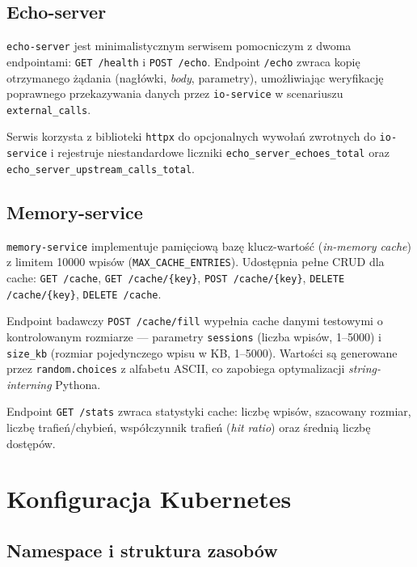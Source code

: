 \subsection{Echo-server}

\texttt{echo-server} jest minimalistycznym serwisem pomocniczym z dwoma endpointami: \texttt{GET /health} i \texttt{POST /echo}. Endpoint \texttt{/echo} zwraca kopię otrzymanego żądania (nagłówki, \textit{body}, parametry), umożliwiając weryfikację poprawnego przekazywania danych przez \texttt{io-service} w scenariuszu \texttt{external\_calls}.

Serwis korzysta z biblioteki \texttt{httpx} do opcjonalnych wywołań zwrotnych do \texttt{io-service} i rejestruje niestandardowe liczniki \texttt{echo\_server\_echoes\_total} oraz \texttt{echo\_server\_upstream\_calls\_total}.

\subsection{Memory-service}

\texttt{memory-service} implementuje pamięciową bazę klucz-wartość (\textit{in-memory cache}) z limitem 10000 wpisów (\texttt{MAX\_CACHE\_ENTRIES}). Udostępnia pełne CRUD dla cache: \texttt{GET /cache}, \texttt{GET /cache/\{key\}}, \texttt{POST /cache/\{key\}}, \texttt{DELETE /cache/\{key\}}, \texttt{DELETE /cache}.

Endpoint badawczy \texttt{POST /cache/fill} wypełnia cache danymi testowymi o kontrolowanym rozmiarze — parametry \texttt{sessions} (liczba wpisów, 1--5000) i \texttt{size\_kb} (rozmiar pojedynczego wpisu w KB, 1--5000). Wartości są generowane przez \texttt{random.choices} z alfabetu ASCII, co zapobiega optymalizacji \textit{string-interning} Pythona.



Endpoint \texttt{GET /stats} zwraca statystyki cache: liczbę wpisów, szacowany rozmiar, liczbę trafień/chybień, współczynnik trafień (\textit{hit ratio}) oraz średnią liczbę dostępów.

\section{Konfiguracja Kubernetes}

\subsection{Namespace i struktura zasobów}

